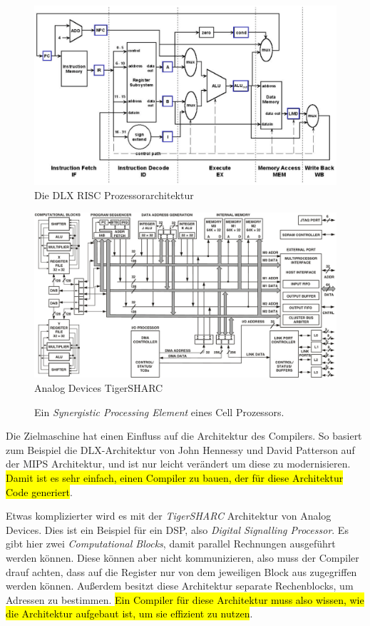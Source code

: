 \documentclass[
  ngerman,
  DIV=12
]{scrartcl}
\begin{document}
\begin{figure}[p]
\includegraphics[width=\textwidth]{media/dlx}
\caption{Die DLX RISC Prozessorarchitektur}\label{fig:dlx}
\end{figure}
\begin{figure}[p]
\includegraphics[width=\textwidth]{media/tigersharc}
\caption{Analog Devices TigerSHARC}\label{fig:tigersharc}
\end{figure}
\begin{figure}
\caption{Ein \emph{Synergistic Processing Element} eines Cell Prozessors.}\label{fig:spe}
\end{figure}

Die Zielmaschine hat einen Einfluss auf die Architektur des Compilers. So basiert zum Beispiel die DLX-Architektur von John Hennessy und David Patterson auf der MIPS Architektur, und ist nur leicht verändert um diese zu modernisieren. \hl{Damit ist es sehr einfach, einen Compiler zu bauen, der für diese Architektur Code generiert}.

Etwas komplizierter wird es mit der \emph{TigerSHARC} Architektur von Analog Devices. Dies ist ein Beispiel für ein DSP, also \emph{Digital Signalling Processor}. Es gibt hier zwei \emph{Computational Blocks}, damit parallel Rechnungen ausgeführt werden können. Diese können aber nicht kommunizieren, also muss der Compiler drauf achten, dass auf die Register nur von dem jeweiligen Block aus zugegriffen werden können. Außerdem besitzt diese Architektur separate Rechenblocks, um Adressen zu bestimmen. \hl{Ein Compiler für diese Architektur muss also wissen, wie die Architektur aufgebaut ist, um sie effizient zu nutzen}.
\end{document}
